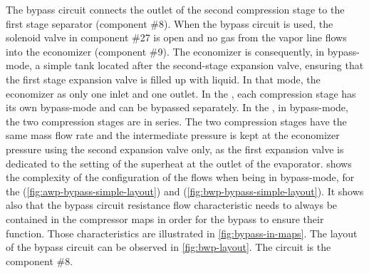 The bypass circuit connects the outlet of the second compression stage
to the first stage separator (component \#8). When the bypass circuit is
used, the solenoid valve in component \#27 is open and no gas from
the vapor line flows into the economizer (component \#9). The
economizer is consequently, in bypass-mode, a simple tank located
after the second-stage expansion valve, ensuring that the first stage
expansion valve is filled up with liquid. In that mode, the economizer
as only one inlet and one outlet. In the
\AWP{}, each compression stage has its own bypass-mode and can be
bypassed separately. In the \BWP{}, in bypass-mode, the two
compression stages are in series. The two compression stages have the
same mass flow rate and the intermediate pressure is kept at the
economizer pressure using the second expansion valve
only, as the first expansion
valve is dedicated to the setting of the superheat at the outlet of
the evaporator.  shows the complexity of
the configuration of the flows when being in bypass-mode, for the
\AWP{} (\cref{fig:awp-bypass-simple-layout}) and \BWP{}
(\cref{fig:bwp-bypass-simple-layout}). It shows also that the bypass
circuit resistance flow characteristic needs to always be contained in
the compressor maps in order for the bypass to ensure their
function. Those characteristics are illustrated in
\cref{fig:bypass-in-maps}. The layout of the bypass circuit can be
observed in \cref{fig:bwp-layout}. The circuit is the component \#8.

